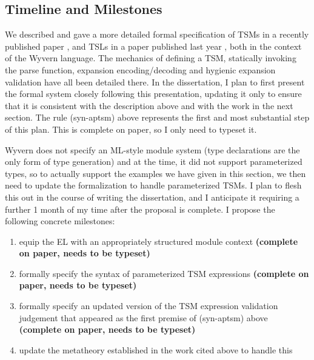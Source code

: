 \subsection{Timeline and Milestones}\label{sec:syntax-timeline}
We described and gave a more detailed formal specification of TSMs in a recently published paper \cite{sac15}, and TSLs in a paper published last year \cite{TSLs}, both in the context of the Wyvern language. The mechanics of defining a TSM, statically invoking the parse function, expansion encoding/decoding and hygienic expansion validation have all been detailed there. In the dissertation, I plan to first present the formal system closely following this presentation, updating it only to ensure that it is consistent with the description above and with the work in the next section. The rule (syn-aptsm) above represents the first and most substantial step of this plan. This is complete on paper, so I only need to typeset it. 

Wyvern does not specify an ML-style module system (type declarations are the only form of type generation) and at the time, it did not support parameterized types, so to actually support the examples we have given in this section, we then need to update the formalization to handle parameterized TSMs. I plan to flesh this out in the course of writing the dissertation, and I anticipate it requiring a further 1 month of my time after the proposal is complete. I propose the following concrete milestones:

\begin{enumerate}
\item equip the EL with an appropriately structured module context \textbf{(complete on paper, needs to be typeset)}
\item formally specify the syntax of parameterized TSM expressions \textbf{(complete on paper, needs to be typeset)}
\item formally specify an updated version of the TSM expression validation judgement that appeared as the first premise of (syn-aptsm) above \textbf{(complete on paper, needs to be typeset)}
\item update the metatheory established in the work cited above to handle this
\end{enumerate}

